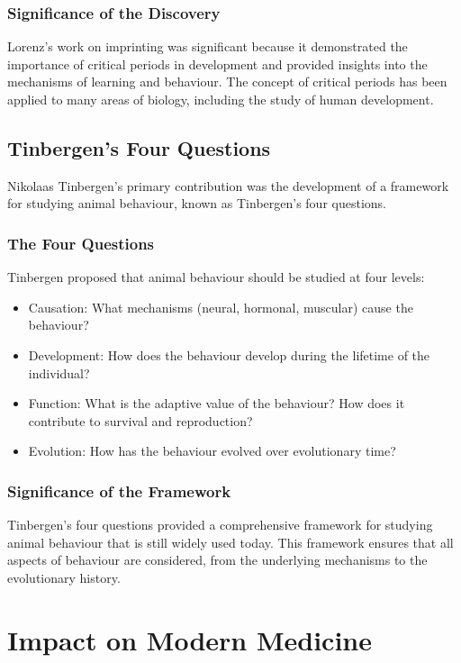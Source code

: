\subsubsection{Significance of the Discovery}

Lorenz's work on imprinting was significant because it demonstrated the importance of critical periods in development and provided insights into the mechanisms of learning and behaviour. The concept of critical periods has been applied to many areas of biology, including the study of human development.

\subsection{Tinbergen's Four Questions}

Nikolaas Tinbergen's primary contribution was the development of a framework for studying animal behaviour, known as Tinbergen's four questions.

\subsubsection{The Four Questions}

Tinbergen proposed that animal behaviour should be studied at four levels:

\begin{itemize}
\item Causation: What mechanisms (neural, hormonal, muscular) cause the behaviour?
\item Development: How does the behaviour develop during the lifetime of the individual?
\item Function: What is the adaptive value of the behaviour? How does it contribute to survival and reproduction?
\item Evolution: How has the behaviour evolved over evolutionary time?
\end{itemize}

\subsubsection{Significance of the Framework}

Tinbergen's four questions provided a comprehensive framework for studying animal behaviour that is still widely used today. This framework ensures that all aspects of behaviour are considered, from the underlying mechanisms to the evolutionary history.

\section{Impact on Modern Medicine}

